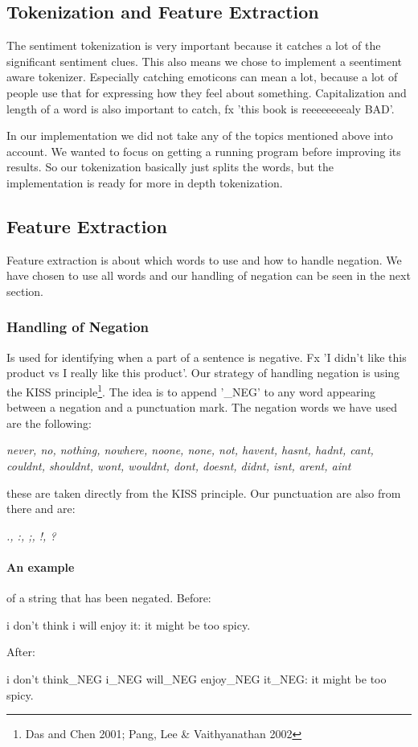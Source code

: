 \subsection{Tokenization and Feature Extraction}
The sentiment tokenization is very important because it catches a lot of the significant sentiment clues.
This also means we chose to implement a seentiment aware tokenizer.
Especially catching emoticons can mean a lot, because a lot of people use that for expressing how they feel about something.
Capitalization and length of a word is also important to catch, fx 'this book is reeeeeeeealy BAD'.

In our implementation we did not take any of the topics mentioned above into account.
We wanted to focus on getting a running program before improving its results.
So our tokenization basically just splits the words, but the implementation is ready for more in depth tokenization.

\subsection{Feature Extraction}
Feature extraction is about which words to use and how to handle negation.
We have chosen to use all words and our handling of negation can be seen in the next section.

\subsubsection{Handling of Negation}
Is used for identifying when a part of a sentence is negative.
Fx 'I didn't like this product vs I really like this product'.
Our strategy of handling negation is using the KISS principle\footnote{Das and Chen 2001; Pang, Lee \& Vaithyanathan 2002}.
The idea is to append '\_NEG' to any word appearing between a negation and a punctuation mark.
The negation words we have used are the following:
\begin{center}
 \it{never, no, nothing, nowhere, noone, none, not, havent, hasnt, hadnt, cant, couldnt, shouldnt, wont, wouldnt, dont, doesnt, didnt, isnt, arent, aint}
\end{center}
these are taken directly from the KISS principle.
Our punctuation are also from there and are:
\begin{center}
 \it{., :, ;, !, ?}
\end{center}

\paragraph{An example} of a string that has been negated. Before:
\begin{center}
 i don't think i will enjoy it: it might be too spicy.
\end{center}
After:
\begin{center}
 i don't think\_NEG i\_NEG will\_NEG enjoy\_NEG it\_NEG: it might be too spicy.
\end{center}
